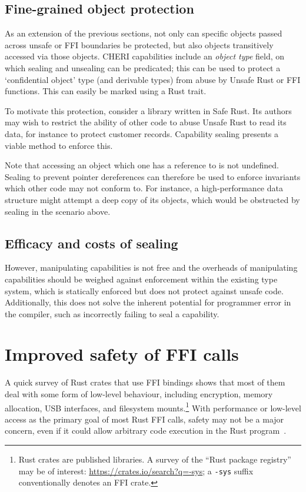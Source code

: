 \documentclass[dissertation.tex]{subfiles}
\begin{document}
\subsection{Fine-grained object protection}
\label{sec:eval-capability-using-type}

As an extension of the previous sections, not only can specific objects
passed across unsafe or FFI boundaries be protected, but also objects
transitively accessed via those objects.
CHERI capabilities include an \emph{object type} field, on which sealing
and unsealing can be predicated; this can be used to protect a
`confidential object' type (and derivable types) from abuse by Unsafe
Rust or FFI functions.
This can easily be marked using a Rust trait.

To motivate this protection, consider a library written in Safe Rust.
Its authors may wish to restrict the ability of other code to abuse
Unsafe Rust to read its data, for instance to protect customer records.
Capability sealing presents a viable method to enforce this.

Note that accessing an object which one has a reference to is not
undefined.
Sealing to prevent pointer dereferences can therefore be used to enforce
invariants which other code may not conform to.
For instance, a high-performance data structure might attempt a deep
copy of its objects, which would be obstructed by sealing in the
scenario above.


\subsection{Efficacy and costs of sealing}
However, manipulating capabilities is not free and the overheads of
manipulating capabilities should be weighed against enforcement within
the existing type system, which is statically enforced but does not
protect against unsafe code.
Additionally, this does not solve the inherent potential for programmer
error in the compiler, such as incorrectly failing to seal a capability.


\section{Improved safety of FFI calls}
\label{sec:eval-rust-xprocess}

A quick survey of Rust crates that use FFI bindings shows that most of
them deal with some form of low-level behaviour, including encryption,
memory allocation, USB interfaces, and filesystem mounts.\footnote{
    Rust crates are published libraries.
    A survey of the ``Rust package registry'' may be of interest:
    \url{https://crates.io/search?q=-sys};
    a \texttt{-sys} suffix conventionally denotes an FFI crate.
}
With performance or low-level access as the primary goal of most Rust
FFI calls, safety may not be a major concern, even if it could allow
arbitrary code execution in the Rust
program~\cite{szekeres-eternal-war}.
\end{document}
